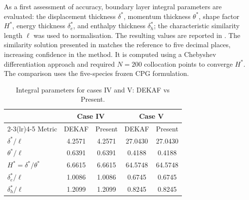 As a first assessment of accuracy, boundary layer integral parameters are evaluated: the displacement thickness $\delta^*$, momentum thickness $\theta^*$, shape factor $H^*$, energy thickness $\delta_e^*$, and enthalpy thickness $\delta_h^*$; the characteristic similarity length $\ell$ was used to normalisation. The resulting values are reported in . The similarity solution presented in  matches the reference to five decimal places, increasing confidence in the method. It is computed using a Chebyshev differentiation approach and required $N=200$ collocation points to converge $H^*$. The comparison uses the five-species frozen \gls{CPG} formulation.

\begin{table}[t]
  \centering
  \caption{Integral parameters for cases IV and V: DEKAF vs Present.}
  \label{tab:integral_params_compare_iv_v}
  \setlength{\tabcolsep}{6pt}
  \small
  \begin{tabular}{@{}lcccc@{}}
    \toprule
    & \multicolumn{2}{c}{Case IV} & \multicolumn{2}{c}{Case V} \\
    \cmidrule(lr){2-3}\cmidrule(lr){4-5}
    Metric & DEKAF & Present & DEKAF & Present \\
    \midrule
    $\delta^*/\ell$        & 4.2571  & 4.2571  & 27.0430 & 27.0430 \\
    $\theta^*/\ell$        & 0.6391  & 0.6391  & 0.4188  & 0.4188  \\
    $H^*=\delta^*/\theta^*$& 6.6615  & 6.6615  & 64.5748 & 64.5748 \\
    $\delta_e^*/\ell$      & 1.0086  & 1.0086  & 0.6745  & 0.6745  \\
    $\delta_h^*/\ell$      & 1.2099  & 1.2099  & 0.8245  & 0.8245  \\
    \bottomrule
  \end{tabular}
\end{table}


